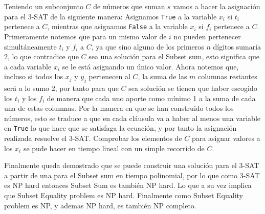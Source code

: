 \documentclass[11pt]{article}
\begin{document}
    Teniendo un subconjunto $C$ de números que suman $s$ vamos a hacer la asignación para el 3-SAT de la siguiente manera:
    Asignamos \texttt{True} a la variable $x_i$ si $t_i$ pertenece a $C$, mientras que asignamos \texttt{False} a la variable 
    $x_i$ si $f_i$ pertenece a $C$. Primeramente notemos que para un mismo valor de $i$ no pueden pertenecer simultáneamente 
    $t_i$ y $f_i$ a $C$, ya que sino alguno de los primeros $n$ dígitos sumaría 2, lo que contradice que $C$ sea una solución 
    para el Subset sum, esto significa que a cada variable $x_i$ se le está asignando un único valor. Ahora notemos que, incluso 
    si todos los $x_j$ y $y_j$ pertenecen al $C$, la suma de las $m$ columnas restantes será a lo sumo 2, por tanto para que $C$
    sea solución se tienen que haber escogido los $t_i$ y los $f_i$ de manera que cada uno aporte como mínimo 1 a la suma de
    cada una de estas columnas. Por la manera en que se han construido todos los números, esto se traduce a que en cada cláusula
    va a haber al menos una variable en \texttt{True} lo que hace que se satisfaga la ecuación, y por tanto la asignación
    realizada resuelve el 3-SAT. Comprobar los elementos de $C$ para asignar valores a los $x_i$ se pude hacer en tiempo lineal
    con un simple recorrido de $C$.

    Finalmente queda demostrado que se puede construir una solución para el 3-SAT a partir de una para el Subset sum en tiempo
    polinomial, por lo que como 3-SAT es NP hard entonces Subset Sum es también NP hard. Lo que a su vez implica que Subset Equality
    problem es NP hard. Finalmente como Subset Equality problem es NP, y ademas NP hard, es también NP completo.
    
\end{document}

